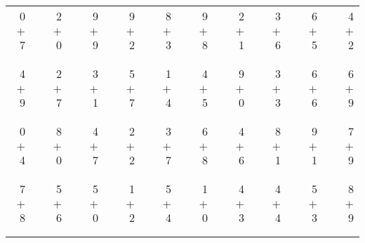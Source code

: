 \documentclass[12pt, letterpaper]{article}
\begin{document}
\begin{tabular}{rrrrrrrrrrrrrrrrrrr}
0 & & 2 & & 9 & & 9 & & 8 & & 9 & & 2 & & 3 & & 6 & & 4\\
$+$ 7 & & $+$ 0 & & $+$ 9 & & $+$ 2 & & $+$ 3 & & $+$ 8 & & $+$ 1 & & $+$ 6 & & $+$ 5 & & $+$ 2\\
\cline{1-1} \cline{3-3} \cline{5-5} \cline{7-7} \cline{9-9} \cline{11-11} \cline{13-13} \cline{15-15} \cline{17-17} \cline{19-19} \\ \\
4 & & 2 & & 3 & & 5 & & 1 & & 4 & & 9 & & 3 & & 6 & & 6\\
$+$ 9 & & $+$ 7 & & $+$ 1 & & $+$ 7 & & $+$ 4 & & $+$ 5 & & $+$ 0 & & $+$ 3 & & $+$ 6 & & $+$ 9\\
\cline{1-1} \cline{3-3} \cline{5-5} \cline{7-7} \cline{9-9} \cline{11-11} \cline{13-13} \cline{15-15} \cline{17-17} \cline{19-19} \\ \\
0 & & 8 & & 4 & & 2 & & 3 & & 6 & & 4 & & 8 & & 9 & & 7\\
$+$ 4 & & $+$ 0 & & $+$ 7 & & $+$ 2 & & $+$ 7 & & $+$ 8 & & $+$ 6 & & $+$ 1 & & $+$ 1 & & $+$ 9\\
\cline{1-1} \cline{3-3} \cline{5-5} \cline{7-7} \cline{9-9} \cline{11-11} \cline{13-13} \cline{15-15} \cline{17-17} \cline{19-19} \\ \\
7 & & 5 & & 5 & & 1 & & 5 & & 1 & & 4 & & 4 & & 5 & & 8\\
$+$ 8 & & $+$ 6 & & $+$ 0 & & $+$ 2 & & $+$ 4 & & $+$ 0 & & $+$ 3 & & $+$ 4 & & $+$ 3 & & $+$ 9\\
\cline{1-1} \cline{3-3} \cline{5-5} \cline{7-7} \cline{9-9} \cline{11-11} \cline{13-13} \cline{15-15} \cline{17-17} \cline{19-19} \\ \\
\end{tabular}
\newpage
\end{document}
